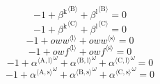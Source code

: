 \begin{equation}
-1 + {\beta^{\mathrm{k}}}^{\langle \mathrm{\mathrm{B}}\rangle} + {\beta^{\mathrm{l}}}^{\langle \mathrm{\mathrm{B}}\rangle} = 0
\end{equation}
\begin{equation}
-1 + {\beta^{\mathrm{k}}}^{\langle \mathrm{\mathrm{C}}\rangle} + {\beta^{\mathrm{l}}}^{\langle \mathrm{\mathrm{C}}\rangle} = 0
\end{equation}
\begin{equation}
-1 + {{o\!w\!w}}^{\langle \mathrm{\mathrm{l}}\rangle} + {{o\!w\!w}}^{\langle \mathrm{\mathrm{s}}\rangle} = 0
\end{equation}
\begin{equation}
-1 + {{o\!w\!f}}^{\langle \mathrm{\mathrm{l}}\rangle} + {{o\!w\!f}}^{\langle \mathrm{\mathrm{s}}\rangle} = 0
\end{equation}
\begin{equation}
-1 + {{\alpha}^{\langle \mathrm{\mathrm{A}},\mathrm{\mathrm{l}}\rangle}}^{\omega} + {{\alpha}^{\langle \mathrm{\mathrm{B}},\mathrm{\mathrm{l}}\rangle}}^{\omega} + {{\alpha}^{\langle \mathrm{\mathrm{C}},\mathrm{\mathrm{l}}\rangle}}^{\omega} = 0
\end{equation}
\begin{equation}
-1 + {{\alpha}^{\langle \mathrm{\mathrm{A}},\mathrm{\mathrm{s}}\rangle}}^{\omega} + {{\alpha}^{\langle \mathrm{\mathrm{B}},\mathrm{\mathrm{s}}\rangle}}^{\omega} + {{\alpha}^{\langle \mathrm{\mathrm{C}},\mathrm{\mathrm{s}}\rangle}}^{\omega} = 0
\end{equation}






